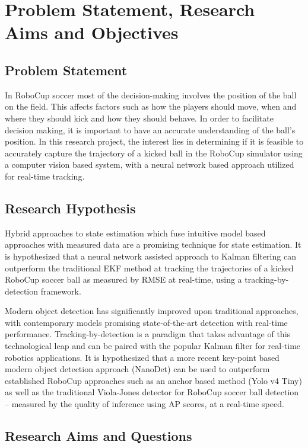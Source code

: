 \documentclass[a4paper,twoside,12pt]{report}
\begin{document}
\chapter{Problem Statement, Research Aims and Objectives}
\section{Problem Statement}

In RoboCup soccer most of the decision-making involves the position of the ball on the field. This affects factors such as how the players should move, when and where they should kick and how they should behave. In order to facilitate decision making, it is important to have an accurate understanding of the ball’s position. In this research project, the interest lies in determining if it is feasible to accurately capture the trajectory of a kicked ball in the RoboCup simulator using a computer vision based system, with a neural network based approach utilized for real-time tracking.

\section{Research Hypothesis}

Hybrid approaches to state estimation which fuse intuitive model based approaches with measured data are a promising technique for state estimation. It is hypothesized that a neural network assisted approach to Kalman filtering can outperform the traditional EKF method at tracking the trajectories of a kicked RoboCup soccer ball as measured by RMSE at real-time, using a tracking-by-detection framework.

Modern object detection has significantly improved upon traditional approaches, with contemporary models promising state-of-the-art detection with real-time performance. Tracking-by-detection is a paradigm that takes advantage of this technological leap and can be paired with the popular Kalman filter for real-time robotics applications. It is hypothesized that a more recent key-point based modern object detection approach (NanoDet) can be used to outperform established RoboCup approaches such as an anchor based method (Yolo v4 Tiny) as well as the traditional Viola-Jones detector for RoboCup soccer ball detection -- measured by the quality of inference using AP scores, at a real-time speed. 

\section{Research Aims and Questions}
\end{document}
